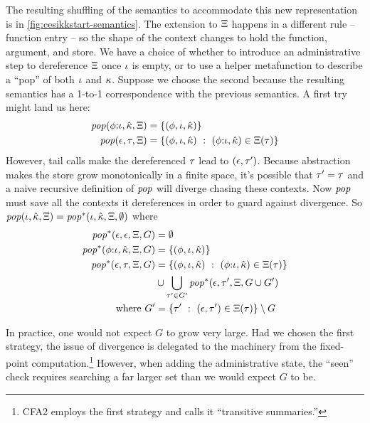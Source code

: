The resulting shuffling of the semantics to accommodate this new representation is in \autoref{fig:cesikkstart-semantics}.
%
The extension to $\Xi$ happens in a different rule -- function entry -- so the shape of the context changes to hold the function, argument, and store.
%
We have a choice of whether to introduce an administrative step to dereference $\Xi$ once $\iota$ is empty, or to use a helper metafunction to describe a ``pop'' of both $\iota$ and $\kappa$.
%
Suppose we choose the second because the resulting semantics has a 1-to-1 correspondence with the previous semantics.
%
A first try might land us here:
\begin{align*}
  \mathit{pop}(\phi{\tt :} \iota,{\hat{\kappa}},\Xi) &= \{ (\phi,\iota,{\hat{\kappa}}) \} \\
  \mathit{pop}(\epsilon,\tau,\Xi) &= \{ (\phi,\iota,{\hat{\kappa}})\ :\ (\phi{\tt :} \iota, {\hat{\kappa}}) \in \Xi(\tau)\}
\end{align*}
However, tail calls make the dereferenced $\tau$ lead to $(\epsilon,\tau')$.
%
Because abstraction makes the store grow monotonically in a finite space, it's possible that $\tau' = \tau$ and a naive recursive definition of $\mathit{pop}$ will diverge chasing these contexts.
%
Now $\mathit{pop}$ must save all the contexts it dereferences in order to guard against divergence.
%
So $\mathit{pop}(\iota,{\hat{\kappa}},\Xi) = \mathit{pop}^*(\iota,{\hat{\kappa}},\Xi,\emptyset)$ where
\begin{align*}
  \mathit{pop}^*(\epsilon,\epsilon,\Xi,G) &= \emptyset \\
  \mathit{pop}^*(\phi{\tt :} \iota,{\hat{\kappa}},\Xi,G) &= \{ (\phi,\iota,{\hat{\kappa}}) \} \\
  \mathit{pop}^*(\epsilon,\tau,\Xi,G) &= \{ (\phi,\iota,{\hat{\kappa}})\ :\ (\phi{\tt :} \iota, {\hat{\kappa}}) \in \Xi(\tau)\} \\
  &\cup \bigcup\limits_{\tau' \in G'}\mathit{pop}^*(\epsilon,\tau',\Xi,G\cup G') \\
  \text{where } G' &= \{ \tau'\ :\ (\epsilon,\tau') \in \Xi(\tau)\} \setminus G
\end{align*}

In practice, one would not expect $G$ to grow very large.
%
Had we chosen the first strategy, the issue of divergence is delegated to the machinery from the fixed-point computation.\footnote{CFA2 employs the first strategy and calls it ``transitive summaries.''}
%
However, when adding the administrative state, the ``seen'' check requires searching a far larger set than we would expect $G$ to be.

